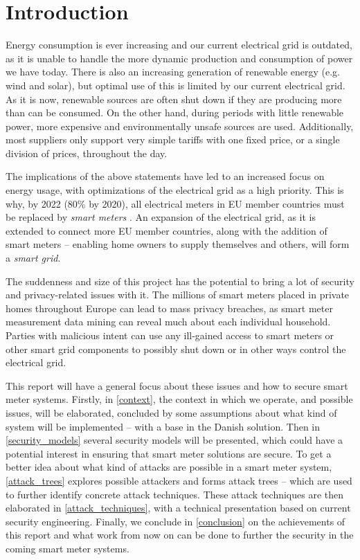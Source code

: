 
\chapter*{Introduction}

Energy consumption is ever increasing and our current electrical grid is outdated, as it is unable to handle the more dynamic production and consumption of power we have today.
There is also an increasing generation of renewable energy (e.g. wind and solar), but optimal use of this is limited by our current electrical grid.
As it is now, renewable sources are often shut down if they are producing more than can be consumed.
On the other hand, during periods with little renewable power, more expensive and environmentally unsafe sources are used.
Additionally, most suppliers only support very simple tariffs with one fixed price, or a single division of prices, throughout the day.

The implications of the above statements have led to an increased focus on energy usage, with optimizations of the electrical grid as a high priority.
This is why, by 2022 (80\% by 2020), all  electrical meters in EU member countries must be replaced by \emph{smart meters} \cite{smart_meter_survey, directive_2009_72_EC}.
An expansion of the electrical grid, as it is extended to connect more EU member countries, along with the addition of smart meters -- enabling home owners to supply themselves and others, will form a \emph{smart grid}.

The suddenness and size of this project has the potential to bring a lot of security and privacy-related issues with it.
The millions of smart meters placed in private homes throughout Europe can lead to mass privacy breaches, as smart meter measurement data mining can reveal much about each individual household.
Parties with malicious intent can use any ill-gained access to smart meters or other smart grid components to possibly shut down or in other ways control the electrical grid.

This report will have a general focus about these issues and how to secure smart meter systems.
Firstly, in \cref{context}, the context in which we operate, and possible issues, will be elaborated, concluded by some assumptions about what kind of system will be implemented -- with a base in the Danish solution.
Then in \cref{security_models} several security models will be presented, which could have a potential interest in ensuring that smart meter solutions are secure.
To get a better idea about what kind of attacks are possible in a smart meter system, \cref{attack_trees} explores possible attackers and forms attack trees -- which are used to further identify concrete attack techniques.
These attack techniques are then elaborated in \cref{attack_techniques}, with a technical presentation based on current security engineering.
Finally, we conclude in \cref{conclusion} on the achievements of this report and what work from now on can be done to further the security in the coming smart meter systems.

